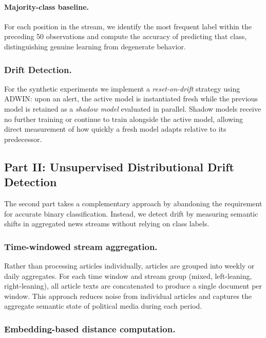 \documentclass[
	a4paper,
	10pt,
	unnumberedsections,
	twoside,
]{LTJournalArticle}
\begin{document}
\paragraph{Majority-class baseline.}
For each position in the stream, we identify the most frequent label within the preceding 50 observations and compute the accuracy of predicting that class, distinguishing genuine learning from degenerate behavior.

\subsubsection{Drift Detection.}

For the synthetic experiments we implement a \textit{reset-on-drift} strategy using ADWIN: upon an alert, the active model is instantiated fresh while the previous model is retained as a \textit{shadow model} evaluated in parallel. Shadow models receive no further training or continue to train alongside the active model, allowing direct measurement of how quickly a fresh model adapts relative to its predecessor.

\subsection{Part II: Unsupervised Distributional Drift Detection}

The second part takes a complementary approach by abandoning the requirement for accurate binary classification. Instead, we detect drift by measuring semantic shifts in aggregated news streams without relying on class labels.

\subsubsection{Time-windowed stream aggregation.}

Rather than processing articles individually, articles are grouped into weekly or daily aggregates. For each time window and stream group (mixed, left-leaning, right-leaning), all article texts are concatenated to produce a single document per window. This approach reduces noise from individual articles and captures the aggregate semantic state of political media during each period.

\subsubsection{Embedding-based distance computation.}
\end{document}
